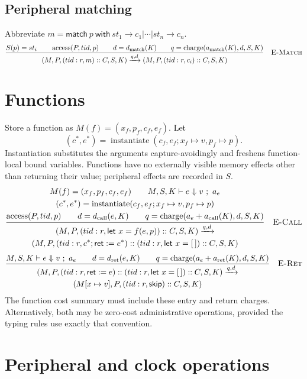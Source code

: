 \documentclass[11pt]{article}
\newcommand{\kw}[1]{\mathsf{#1}}
\newcommand{\step}[2]{\xrightarrow{#1,#2}}
\newcommand{\rulelabel}[1]{\quad\textsc{#1}}
\newcommand{\charge}{\operatorname{charge}}
\newcommand{\access}{\operatorname{access}}
\newcommand{\frm}[3]{(#1:#2,#3)}
\begin{document}
\subsection{Peripheral matching}
Abbreviate $m=\kw{match}\ p\ \kw{with}\ st_1\to c_1|\cdots|st_n\to c_n$.
\[
\frac{
 S(p)=st_i\qquad\access(P,tid,p)
 \qquad d=d_{\mathrm{match}}(K)
 \qquad q=\charge(a_{\mathrm{match}}(K),d,S,K)
}{
 (M,P,\frm{tid}{r}{m}::C,S,K)
 \step{q}{d}
 (M,P,\frm{tid}{r}{c_i}::C,S,K)
}\rulelabel{E-Match}
\]

\section{Functions}
Store a function as $M(f)=(x_f,p_f,c_f,e_f)$. Let
\[
 (c^*,e^*)=\operatorname{instantiate}(c_f,e_f;
                         x_f\mapsto v,p_f\mapsto p).
\]
Instantiation substitutes the arguments capture-avoidingly and freshens
function-local bound variables. Functions have no externally visible memory
effects other than returning their value; peripheral effects are recorded in $S$.
\[
\frac{
 \begin{gathered}
 M(f)=(x_f,p_f,c_f,e_f)\qquad M,S,K\vdash e\Downarrow v\ ;\ a_e\\
 (c^*,e^*)=\operatorname{instantiate}(c_f,e_f;x_f\mapsto v,p_f\mapsto p)\\
 \access(P,tid,p)\qquad d=d_{\mathrm{call}}(e,K)
 \qquad q=\charge(a_e+a_{\mathrm{call}}(K),d,S,K)
 \end{gathered}
}{
 \begin{gathered}
 (M,P,\frm{tid}{r}{\kw{let}\ x=f(e,p)}::C,S,K)\step{q}{d}\\
 (M,P,\frm{tid}{r}{c^*;\kw{ret}:=e^*}
       ::\frm{tid}{r}{\kw{let}\ x=[\,]}::C,S,K)
 \end{gathered}
}\rulelabel{E-Call}
\]
\[
\frac{
 M,S,K\vdash e\Downarrow v\ ;\ a_e
 \qquad d=d_{\mathrm{ret}}(e,K)
 \qquad q=\charge(a_e+a_{\mathrm{ret}}(K),d,S,K)
}{
 \begin{gathered}
 (M,P,\frm{tid}{r}{\kw{ret}:=e}::\frm{tid}{r}{\kw{let}\ x=[\,]}::C,S,K)
 \step{q}{d}\\
 (M[x\mapsto v],P,\frm{tid}{r}{\kw{skip}}::C,S,K)
 \end{gathered}
}\rulelabel{E-Ret}
\]
The function cost summary must include these entry and return charges.
Alternatively, both may be zero-cost administrative operations, provided the
typing rules use exactly that convention.

\section{Peripheral and clock operations}
\end{document}
